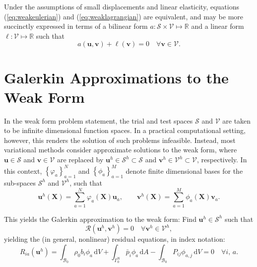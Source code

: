 Under the assumptions of small displacements and linear elasticity, equations (\ref{eq:weakeulerian}) and (\ref{eq:weaklagrangian}) are equivalent, and may be more succinctly expressed in terms of a bilinear form $a \colon \mathcal{S} \times \mathcal{V} \mapsto \mathbb{R}$ and a linear form $\ell : \mathcal{V} \mapsto \mathbb{R}$ such that
\begin{equation}
  a(\bm{u}, \bm{v}) + \ell (\bm{v}) = 0 \quad \forall \bm{v} \in \mathcal{V}.
  \label{eq:bilinear_form}
\end{equation}

\section{Galerkin Approximations to the Weak Form}

In the weak form problem statement, the trial and test spaces $\mathcal{S}$ and $\mathcal{V}$ are taken to be infinite dimensional function spaces. In a practical computational setting, however, this renders the solution of such problems infeasible. Instead, most variational methods consider approximate solutions to the weak form, where $\bm{u} \in \mathcal{S}$ and $\bm{v} \in \mathcal{V}$ are replaced by $\bm{u}^h \in \mathcal{S}^h \subset \mathcal{S}$ and $\bm{v}^h \in \mathcal{V}^h \subset \mathcal{V}$, respectively. In this context, $\left\{ \varphi_a \right\}_{a = 1}^{N}$ and $\left\{ \phi_a \right\}_{a = 1}^{M}$ denote finite dimensional bases for the sub-spaces $\mathcal{S}^h$ and $\mathcal{V}^h$, such that
\begin{equation}
  \bm{u}^h (\bm{X}) = \sum_{a = 1}^N \varphi_a (\bm{X}) \bm{u}_a, \qquad \bm{v}^h (\bm{X}) = \sum_{a = 1}^M \phi_a (\bm{X}) \bm{v}_a.
\end{equation}

This yields the Galerkin approximation to the weak form:
Find $\bm{u}^h \in \mathcal{S}^h$ such that
\begin{equation}
  \mathcal{R}(\bm{u}^h, \bm{v}^h) = 0 \quad \forall \bm{v}^h \in \mathcal{V}^h,
  \label{eq:weakform}
\end{equation}
yielding the (in general, nonlinear) residual equations, in index notation:
\begin{equation}
  R_{ia} (\bm{u}^h) = \int_{\mathcal{B}_0} \rho_0 b_i \phi_a \, \mathrm dV + \int_{\Gamma^{\mathrm N}_0} \bar{p}_i \phi_a \, \mathrm dA - \int_{\mathcal{B}_0} P_{ij} \phi_{a,j} \, \mathrm dV = 0 \quad \forall i, \, a.
  \label{eq:residual}
\end{equation}

